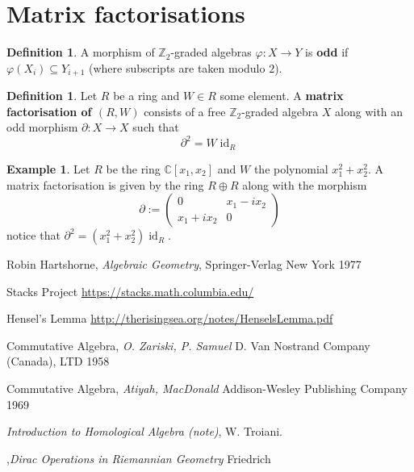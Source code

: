 \documentclass[12pt]{article}
\theoremstyle{plain}
\theoremstyle{definition}
\newtheorem{defn}[thm]{Definition} %
\newtheorem{example}[thm]{Example}
\newcommand{\bb}[1]{\mathbb{#1}}
\newcommand{\lto}{\longrightarrow}
\begin{document}
	\section{Matrix factorisations}
	\begin{defn}
		A morphism of $\bb{Z}_2$-graded algebras $\varphi:X \lto Y$ is \textbf{odd} if $\varphi(X_i) \subseteq Y_{i+1}$ (where subscripts are taken modulo $2$).
	\end{defn}
	\begin{defn}
		Let $R$ be a ring and $W \in R$ some element. A \textbf{matrix factorisation of $(R,W)$} consists of a free $\bb{Z}_2$-graded algebra $X$ along with an odd morphism $\partial: X \lto X$ such that
		\begin{equation}
			\partial^2 = W\operatorname{id}_R
		\end{equation}
	\end{defn}
	\begin{example}
		Let $R$ be the ring $\bb{C}[x_1,x_2]$ and $W$ the polynomial $x_1^2 + x_2^2$. A matrix factorisation is given by the ring $R \oplus R$ along with the morphism
		\begin{equation}
			\partial := 
			\begin{pmatrix}
				0 & x_1 - ix_2\\
				x_1 + ix_2 & 0
			\end{pmatrix}
		\end{equation}
		notice that $\partial^2 = (x_1^2 + x_2^2)\operatorname{id}_R$.
	\end{example}
	
	
	
	
	
	
	
	
	
	
	
	\begin{thebibliography}{9}
		 Robin Hartshorne, \emph{Algebraic Geometry}, Springer-Verlag New York 1977
		
		 Stacks Project \url{https://stacks.math.columbia.edu/}
		
		 Hensel's Lemma \url{http://therisingsea.org/notes/HenselsLemma.pdf}
		
		 Commutative Algebra, \emph{O. Zariski, P. Samuel} D. Van Nostrand Company (Canada), LTD 1958
		
		 Commutative Algebra, \emph{Atiyah, MacDonald} Addison-Wesley Publishing Company 1969
		
		 \emph{Introduction to Homological Algebra (note)}, W. Troiani.
		
		,\emph{Dirac Operations in Riemannian Geometry} Friedrich
		
	\end{thebibliography}
	
\end{document}
